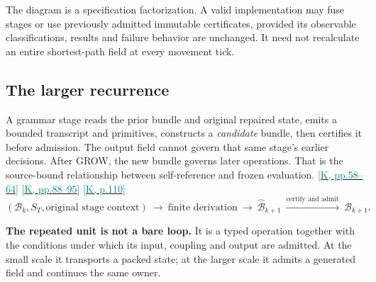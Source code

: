 \documentclass[11pt,a4paper]{article}
\newcommand{\kref}[1]{\hyperlink{baseline.#1}{\textcolor{teal}{[K, p.#1]}}}
\newcommand{\krange}[2]{\hyperlink{baseline.#1}{\textcolor{teal}{[K, pp.#1--#2]}}}
\theoremstyle{lpstyle}
\begin{document}
\begin{center}
\end{center}
The diagram is a specification factorization. A valid implementation may fuse stages or use previously admitted immutable certificates, provided its observable classifications, results and failure behavior are unchanged. It need not recalculate an entire shortest-path field at every movement tick.

\subsection{The larger recurrence}
A grammar stage reads the prior bundle and original repaired state, emits a bounded transcript and primitives, constructs a \emph{candidate} bundle, then certifies it before admission. The output field cannot govern that same stage's earlier decisions. After GROW, the new bundle governs later operations. That is the source-bound relationship between self-reference and frozen evaluation. \krange{58}{64} \krange{88}{95} \kref{110}
\[
(\mathcal B_k,S_T,\text{original stage context})
\ \longrightarrow\ \text{finite derivation}\ \longrightarrow\ \widehat{\mathcal B}_{k+1}
\ \xrightarrow{\text{certify and admit}}\ \mathcal B_{k+1}.
\]

\begin{principle}
\textbf{The repeated unit is not a bare loop.} It is a typed operation together with the conditions under which its input, coupling and output are admitted. At the small scale it transports a packed state; at the larger scale it admits a generated field and continues the same owner.
\end{principle}
\end{document}

